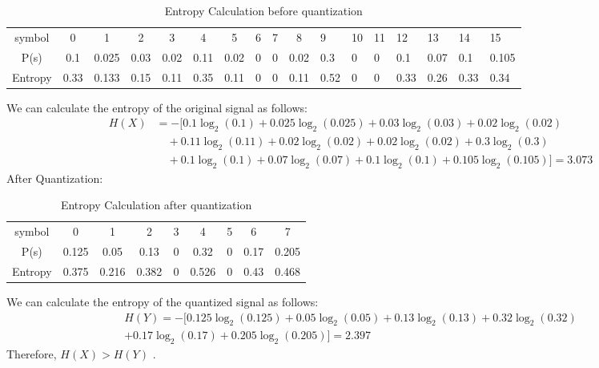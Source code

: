 \documentclass[letterpaper, 12pt]{article}
\begin{document}
\begin{table}
    \centering
    \begin{tabular}{cccccccccclllllll}
         symbol&  0&  1&  2&  3&  4&  5&  6&  7& 8 & 9& 10& 11& 12& 13&14 &15\\
         P(s)&  0.1&  0.025&  0.03&  0.02&  0.11&  0.02&  0&  0& 0.02 & 0.3& 0& 0& 0.1& 0.07& 0.1&0.105\\
         Entropy&  0.33&  0.133&  0.15&  0.11&  0.35&  0.11&  0&  0&  0.11& 0.52& 0& 0& 0.33& 0.26& 0.33&0.34\\
    \end{tabular}
    \caption{Entropy Calculation before quantization}
    \label{tab:my_label}
\end{table}

We can calculate the entropy of the original signal as follows:
\begin{align*}
H(X) &= -[0.1\log_2(0.1) + 0.025\log_2(0.025) + 0.03\log_2(0.03) + 0.02\log_2(0.02) \\
& \quad + 0.11\log_2(0.11) + 0.02\log_2(0.02) + 0.02\log_2(0.02) + 0.3\log_2(0.3) \\
& \quad + 0.1\log_2(0.1) + 0.07\log_2(0.07) + 0.1\log_2(0.1) + 0.105\log_2(0.105)] = 3.073
\end{align*}
After Quantization:
\begin{table}[htbp]
    \centering
    \begin{tabular}{ccccccccc}
         symbol&  0&  1&  2&  3&  4&  5&  6&  7\\
         P(s)&  0.125&  0.05&  0.13&  0&  0.32&  0&  0.17&  0.205\\
         Entropy&  0.375&  0.216&  0.382&  0&  0.526&  0&  0.43&  0.468\\
    \end{tabular}
    \caption{Entropy Calculation after quantization}
    \label{tab:my_label}
\end{table}
We can calculate the entropy of the quantized signal as follows: 
\begin{align*}
    H(Y) = -[0.125 \log_2(0.125) + 0.05 \log_2(0.05) + 0.13 \log_2(0.13) + 0.32 \log_2(0.32) \\ + 0.17 \log_2(0.17) + 0.205 \log_2(0.205)] = 2.397
\end{align*}
Therefore, $H(X) > H(Y)$ .
\newpage
\newpage
\end{document}
